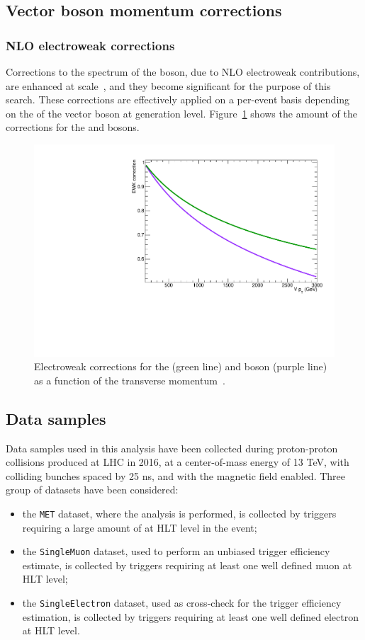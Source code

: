 
\subsection{Vector boson momentum corrections}

\subsubsection{NLO electroweak corrections}

Corrections to the \pt spectrum of the \V boson, due to NLO electroweak contributions, are enhanced at \TeV scale~\cite{Kallweit:2015fta}, and they become significant for the purpose of this search. These corrections are effectively applied on a per-event basis depending on the \pt of the vector boson at generation level. Figure~\ref{fig:ewk} shows the amount of the corrections for the \W and \Z bosons.

\begin{figure}[!htb]
 \centering
   \includegraphics[width=.5\textwidth]{figures/EWK.pdf}
 \caption{Electroweak corrections for the \Z (green line) and \W boson (purple line) as a function of the transverse momentum~\cite{Kallweit:2015fta}.}
 \label{fig:ewk}
\end{figure}



\subsection{Data samples}
\label{sec:data}

Data samples used in this analysis have been collected during proton-proton collisions produced at LHC in 2016, at a center-of-mass energy of 13 TeV, with colliding bunches spaced by 25 ns, and with the magnetic field enabled. Three group of datasets have been considered:
\begin{itemize}
\item the {\tt MET} dataset, where the analysis is performed, is collected by triggers requiring a large amount of \met at HLT level in the event;
\item the {\tt SingleMuon} dataset, used to perform an unbiased trigger efficiency estimate, is collected by triggers requiring at least one well defined muon at HLT level;
\item the {\tt SingleElectron} dataset, used as cross-check for the trigger efficiency estimation, is collected by triggers requiring at least one well defined electron at HLT level.
\end{itemize}

